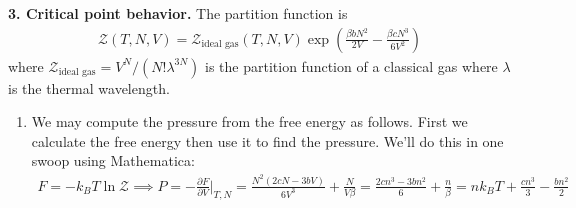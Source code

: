 \documentclass{article}
\theoremstyle{definition}
\newcommand{\p}{\partial}
\newcommand{\be}{\beta}
\newcommand{\f}[2]{\frac{#1}{#2}}
\newcommand{\lp}{\left(}
\newcommand{\rp}{\right)}
\begin{document}
\noindent \textbf{3. Critical point behavior.} The partition function is 
\begin{align*}
\mathcal{Z}(T,N,V) = \mathcal{Z}_\text{ideal gas}(T,N,V) \exp\lp \f{\be b N^2}{2V} - \f{\be c N^3}{6V^2} \rp
\end{align*}
where $\mathcal{Z}_\text{ideal gas} = V^N/(N! \lambda^{3N})$ is the partition function of a classical gas where $\lambda$ is the thermal wavelength. 

\begin{enumerate}[label=(\alph*)]
	\item We may compute the pressure from the free energy as follows. First we calculate the free energy then use it to find the pressure. We'll do this in one swoop using Mathematica:
	\begin{align*}
	F = -k_BT \ln \mathcal{Z} \implies \boxed{P} = -\f{\p F}{\p V}\bigg\vert_{T,N} = {\f{N^2(2cN - 3bV)}{6V^3} + \f{N}{V\be}} = \f{2cn^3 - 3bn^2}{6} + \f{n}{\be} = \boxed{nk_BT + \f{cn^3}{3} - \f{b n^2}{2}}
	\end{align*}
	

\end{enumerate}
\end{document}
